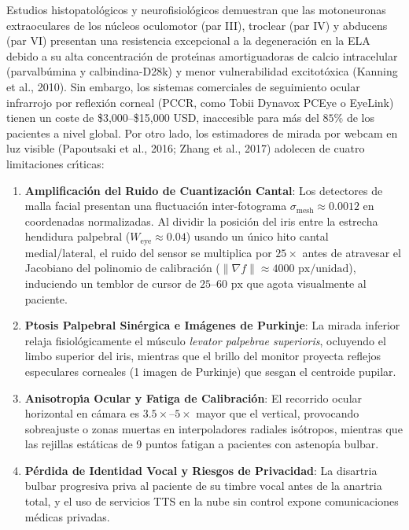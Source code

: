 \documentclass[twocolumn,10pt]{article}
\begin{document}
Estudios histopatol\'ogicos y neurofisiol\'ogicos demuestran que las motoneuronas extraoculares de los n\'ucleos oculomotor (par III), troclear (par IV) y abducens (par VI) presentan una resistencia excepcional a la degeneraci\'on en la ELA debido a su alta concentraci\'on de prote\'{\i}nas amortiguadoras de calcio intracelular (parvalb\'umina y calbindina-D28k) y menor vulnerabilidad excitot\'oxica (Kanning et al., 2010). Sin embargo, los sistemas comerciales de seguimiento ocular infrarrojo por reflexi\'on corneal (PCCR, como Tobii Dynavox PCEye o EyeLink) tienen un coste de \$3,000--\$15,000 USD, inaccesible para m\'as del $85\%$ de los pacientes a nivel global. Por otro lado, los estimadores de mirada por webcam en luz visible (Papoutsaki et al., 2016; Zhang et al., 2017) adolecen de cuatro limitaciones cr\'{\i}ticas:
\begin{enumerate}
    \item \textbf{Amplificaci\'on del Ruido de Cuantizaci\'on Cantal}: Los detectores de malla facial presentan una fluctuaci\'on inter-fotograma $\sigma_{\text{mesh}} \approx 0.0012$ en coordenadas normalizadas. Al dividir la posici\'on del iris entre la estrecha hendidura palpebral ($W_{\text{eye}} \approx 0.04$) usando un \'unico hito cantal medial/lateral, el ruido del sensor se multiplica por $25\times$ antes de atravesar el Jacobiano del polinomio de calibraci\'on ($\|\nabla f\| \approx 4000\text{ px/unidad}$), induciendo un temblor de cursor de $25\text{--}60\text{ px}$ que agota visualmente al paciente.
    \item \textbf{Ptosis Palpebral Sin\'ergica e Im\'agenes de Purkinje}: La mirada inferior relaja fisiol\'ogicamente el m\'usculo \textit{levator palpebrae superioris}, ocluyendo el limbo superior del iris, mientras que el brillo del monitor proyecta reflejos especulares corneales (1\textordfeminine{} imagen de Purkinje) que sesgan el centroide pupilar.
    \item \textbf{Anisotrop\'{\i}a Ocular y Fatiga de Calibraci\'on}: El recorrido ocular horizontal en c\'amara es $3.5\times\text{--}5\times$ mayor que el vertical, provocando sobreajuste o zonas muertas en interpoladores radiales is\'otropos, mientras que las rejillas est\'aticas de 9 puntos fatigan a pacientes con astenop\'{\i}a bulbar.
    \item \textbf{P\'erdida de Identidad Vocal y Riesgos de Privacidad}: La disartria bulbar progresiva priva al paciente de su timbre vocal antes de la anartria total, y el uso de servicios TTS en la nube sin control expone comunicaciones m\'edicas privadas.
\end{enumerate}
\end{document}
